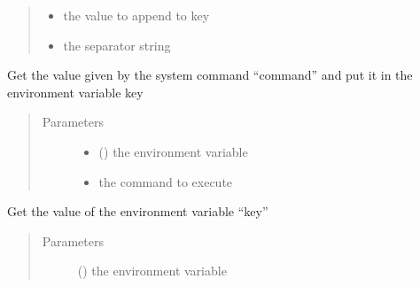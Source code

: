 \documentclass[a4paper,10pt,english]{sphinxmanual}
\begin{document}
\begin{fulllineitems}
\begin{fulllineitems}
\begin{quote}
\begin{description}
\begin{itemize}
\item {} 
 \textendash{} the value to append to key

\item {} 
 \textendash{} the separator string

\end{itemize}

\end{description}\end{quote}

\end{fulllineitems}


\begin{fulllineitems}
\label{\detokenize{commands/apidoc/src:src.environment.Environ.command_value}}
Get the value given by the system command “command” 
and put it in the environment variable key
\begin{quote}\begin{description}
\item[{Parameters}] \leavevmode\begin{itemize}
\item {} 
 () \textendash{} the environment variable

\item {} 
 \textendash{} the command to execute

\end{itemize}

\end{description}\end{quote}

\end{fulllineitems}


\begin{fulllineitems}
\label{\detokenize{commands/apidoc/src:src.environment.Environ.get}}
Get the value of the environment variable “key”
\begin{quote}\begin{description}
\item[{Parameters}] \leavevmode
{} () \textendash{} the environment variable


\end{description}
\end{quote}
\end{fulllineitems}
\end{fulllineitems}
\end{document}
